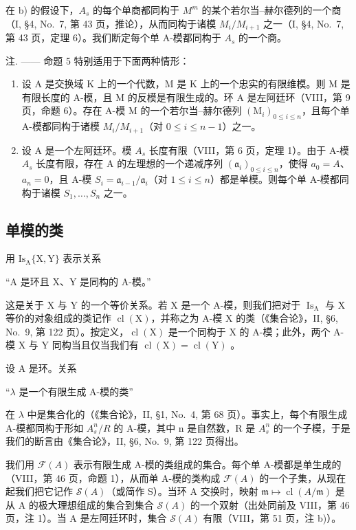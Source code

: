 在 b) 的假设下，\(A_{s}\) 的每个单商都同构于 \(M^{m}\) 的某个若尔当–赫尔德列的一个商（I, §4, No.~7, 第 43 页，推论），从而同构于诸模 \(M_{i}/M_{i+1}\) 之一（I, §4, No.~7, 第 43 页，定理 6）。我们断定每个单 A-模都同构于 \(A_{s}\) 的一个商。

注. —— 命题 5 特别适用于下面两种情形：

\begin{enumerate}
\def\labelenumi{\alph{enumi})}
\item
  设 A 是交换域 K 上的一个代数，M 是 K 上的一个忠实的有限维模。则 M 是有限长度的 A-模，且 M 的反模是有限生成的。环 A 是左阿廷环（VIII，第 9 页，命题 6）。存在 A-模 M 的一个若尔当–赫尔德列 \((\mathrm{M}_{i})_{0\leqslant i\leqslant n}\)，且每个单 A-模都同构于诸模 \(M_{i}/M_{i+1}\)（对 \(0\leqslant i\leqslant n-1\)）之一。
\item
  设 A 是一个左阿廷环。模 \(A_{s}\) 长度有限（VIII，第 6 页，定理 1）。由于 A-模 \(A_{s}\) 长度有限，存在 A 的左理想的一个递减序列 \((\mathfrak{a}_{i})_{0\leqslant i\leqslant n}\)，使得 \(a_{0}=A\)、\(a_{n}=0\)，且 A-模 \(S_{i}=\mathfrak{a}_{i-1}/\mathfrak{a}_{i}\)（对 \(1\leqslant i\leqslant n\)）都是单模。则每个单 A-模都同构于诸模 \(S_{1},\ldots,S_{n}\) 之一。
\end{enumerate}

\subsection{单模的类}

用 \(\mathrm{Is}_{\mathrm{A}}\{\mathrm{X},\mathrm{Y}\}\) 表示关系

``A 是环且 X、Y 是同构的 A-模。''

这是关于 X 与 Y 的一个等价关系。若 X 是一个 A-模，则我们把对于 \(\operatorname{Is}_{\mathrm{A}}\) 与 X 等价的对象组成的类记作 \(\operatorname{cl}(\mathrm{X})\)，并称之为 A-模 X 的类（《集合论》，II, §6, No.~9, 第 122 页）。按定义，\(\operatorname{cl}(\mathrm{X})\) 是一个同构于 X 的 A-模；此外，两个 A-模 X 与 Y 同构当且仅当我们有 \(\operatorname{cl}(\mathrm{X}) = \operatorname{cl}(\mathrm{Y})\) 。

设 A 是环。关系

``\(\lambda\) 是一个有限生成 A-模的类''

在 \(\lambda\) 中是集合化的（《集合论》，II, §1, No.~4, 第 68 页）。事实上，每个有限生成 A-模都同构于形如 \(A_{s}^{n}/R\) 的 A-模，其中 n 是自然数，R 是 \(A_{s}^{n}\) 的一个子模，于是我们的断言由《集合论》，II, §6, No.~9, 第 122 页得出。

我们用 \(\mathcal{F}(A)\) 表示有限生成 A-模的类组成的集合。每个单 A-模都是单生成的（VIII，第 46 页，命题 1），从而单 A-模的类构成 \(\mathcal{F}(A)\) 的一个子集，从现在起我们把它记作 \(\mathcal{S}(A)\)（或简作 S）。当环 A 交换时，映射 \(\mathfrak{m} \mapsto \operatorname{cl}(A/\mathfrak{m})\) 是从 A 的极大理想组成的集合到集合 \(\mathcal{S}(A)\) 的一个双射（出处同前及 VIII，第 46 页，注 1）。当 A 是左阿廷环时，集合 \(\mathcal{S}(A)\) 有限（VIII，第 51 页，注 b)）。

